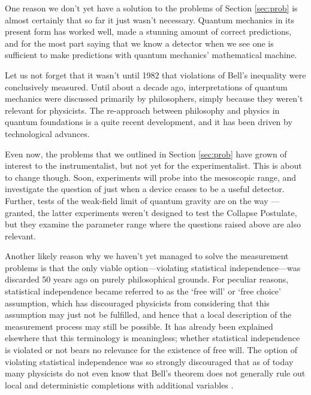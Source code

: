 \documentclass[superscriptaddress,floatfix,nofootinbib,12pt]{revtex4-2}
\begin{document}
One reason we don't yet have a solution to the problems of Section \ref{sec:prob} is almost certainly that so far it just wasn't necessary. Quantum mechanics in its present form has worked well, made a stunning amount of correct predictions, and for the most part saying that we know a detector when we see one is sufficient to make predictions with quantum mechanics' mathematical machine. 

Let us not forget that it wasn't until 1982 \cite{Aspect1982BellTest} that violations of Bell's inequality were conclusively measured. Until about a decade ago, interpretations of quantum mechanics were discussed primarily by philosophers, simply because they weren't relevant for physicists. The re-approach between philosophy and physics in quantum foundations is a quite recent development, and it has been driven by technological advances. 

Even now, the problems that we outlined in Section \ref{sec:prob} have grown of interest to the instrumentalist, but not yet for the experimentalist. This is about to change though. Soon, experiments will probe into the mesoscopic range, and investigate the question of just when a device ceases to be a useful detector. Further, tests of the weak-field limit of quantum gravity are on the way \cite{Bose2017EntWitnessQG,Marletto2017GravIndEnt}---granted, the latter experiments weren't designed to test the Collapse Postulate, but they examine the parameter range where the questions raised above are also relevant.

Another likely reason why we haven't yet managed to solve the measurement problems is that the only viable option---violating statistical independence---was discarded 50 years ago on purely philosophical grounds. For peculiar reasons, statistical independence became referred to as the `free will' or `free choice' assumption, which has discouraged physicists from considering that this assumption may just not be fulfilled, and hence that a local description of the measurement process may still be possible. It has already been explained elsewhere \cite{Hossenfelder2020Rethinking,Hossenfelder2020Perplexed} that this terminology is meaningless; whether statistical independence is violated or not bears no relevance for the existence of free will.
The option of violating statistical independence was so strongly discouraged that as of today many physicists do not even know that Bell's theorem does not generally rule out local and deterministic completions with additional variables \cite{Schlosshauer2013Attitudes}.
\end{document}
